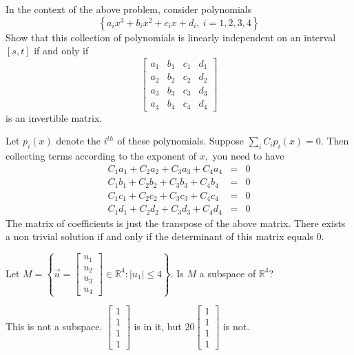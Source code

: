 \documentclass{ximera}
\begin{document}
\begin{problem}\label{prb:10.59} In the context of the above problem, consider polynomials
\begin{equation*}
\left\{ a_{i}x^{3}+b_{i}x^{2}+c_{i}x+d_{i},\ i=1,2,3,4\right\}
\end{equation*}
Show that this collection of polynomials is linearly independent on an
interval $\left[ s,t\right] $ if and only if
\begin{equation*}
\left[
\begin{array}{cccc}
a_{1} & b_{1} & c_{1} & d_{1} \\
a_{2} & b_{2} & c_{2} & d_{2} \\
a_{3} & b_{3} & c_{3} & d_{3} \\
a_{4} & b_{4} & c_{4} & d_{4}
\end{array}
\right]
\end{equation*}
is an invertible matrix.
\begin{hint}
Let $p_{i}\left( x\right) $ denote the $i^{th}$ of
these polynomials. Suppose $\sum_{i}C_{i}p_{i}\left( x\right) =0.$ Then
collecting terms according to the exponent of $x,$ you need to have
\begin{eqnarray*}
C_{1}a_{1}+C_{2}a_{2}+C_{3}a_{3}+C_{4}a_{4} &=&0 \\
C_{1}b_{1}+C_{2}b_{2}+C_{3}b_{3}+C_{4}b_{4} &=&0 \\
C_{1}c_{1}+C_{2}c_{2}+C_{3}c_{3}+C_{4}c_{4} &=&0 \\
C_{1}d_{1}+C_{2}d_{2}+C_{3}d_{3}+C_{4}d_{4} &=&0
\end{eqnarray*}
The matrix of coefficients is just the transpose of the above matrix. There
exists a non trivial solution if and only if the determinant of this matrix
equals 0.
\end{hint}
\end{problem}





\begin{problem}\label{prb:10.62} Let $M=\left\{ \vec{u}=\begin{bmatrix}u_{1}\\u_{2}\\u_{3}\\u_{4}\end{bmatrix} \in
\mathbb{R}^{4}:\left| u_{1}\right| \leq 4\right\} .$ Is $M$ a subspace of $\mathbb{R}^4$?
\begin{hint}
This is not a subspace. $\left[ \begin{array}{r}
1 \\
1 \\
1 \\
1
\end{array}
\right] $ is in
it, but $20\left[
\begin{array}{r}
1 \\
1 \\
1 \\
1
\end{array}
\right] $ is not.
\end{hint}
\end{problem}
\end{document}

